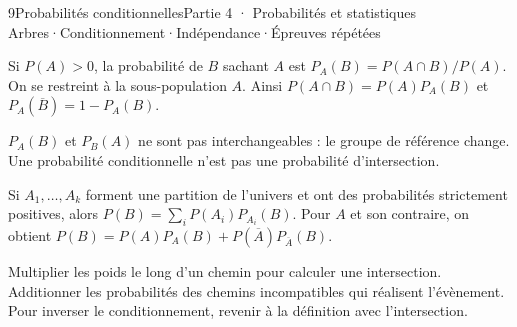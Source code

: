 \begin{ouverture}[conditionnelles]{9}{Probabilités conditionnelles}{Partie 4 · Probabilités et statistiques}
{Arbres\enspace·\enspace Conditionnement\enspace·\enspace Indépendance\enspace·\enspace Épreuves répétées}
\end{ouverture}
\essentiel
{}
\begin{definition}
Si $P(A)>0$, la probabilité de $B$ sachant $A$ est
$P_A(B)=P(A\cap B)/P(A)$. On se restreint à la sous-population $A$.
Ainsi $P(A\cap B)=P(A)P_A(B)$ et $P_A(\overline B)=1-P_A(B)$.
\end{definition}
\begin{attention}
$P_A(B)$ et $P_B(A)$ ne sont pas interchangeables : le groupe de référence
change. Une probabilité conditionnelle n'est pas une probabilité d'intersection.
\end{attention}
\begin{theoreme}
Si $A_1,\ldots,A_k$ forment une partition de l'univers et ont des probabilités
strictement positives, alors
$P(B)=\sum_iP(A_i)P_{A_i}(B)$.
Pour $A$ et son contraire, on obtient
$P(B)=P(A)P_A(B)+P(\overline A)P_{\overline A}(B)$.
\end{theoreme}
\begin{center}
\par{}
\end{center}

\begin{savoirfaire}
Multiplier les poids le long d'un chemin pour calculer une intersection.
Additionner les probabilités des chemins incompatibles qui réalisent l'évènement.
Pour inverser le conditionnement, revenir à la définition avec l'intersection.
\end{savoirfaire}

